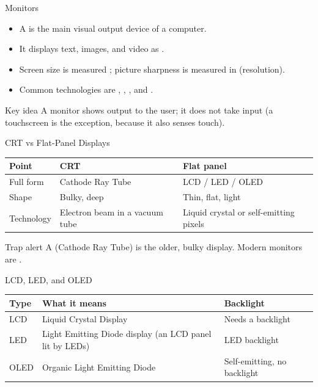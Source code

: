 \documentclass[aspectratio=169]{beamer}
\begin{document}
\begin{frame}{Monitors}
  \begin{itemize}
    \item A  is the main visual output device of a computer.
    \item It displays text, images, and video as .
    \item Screen size is measured ; picture
      sharpness is measured in  (resolution).
    \item Common technologies are , , , and
      .
  \end{itemize}
  \begin{block}{Key idea}
    A monitor shows output to the user; it does not take input (a touchscreen
    is the exception, because it also senses touch).
  \end{block}
\end{frame}

\begin{frame}{CRT vs Flat-Panel Displays}
  \begin{center}
    \begin{tabular}{p{}p{}p{}}
      \toprule
      \textbf{Point} & \textbf{CRT} & \textbf{Flat panel} \\
      \midrule
      Full form & Cathode Ray Tube & LCD / LED / OLED \\
      Shape & Bulky, deep & Thin, flat, light \\
      Technology & Electron beam in a vacuum tube & Liquid crystal or self-emitting pixels \\
      \bottomrule
    \end{tabular}
  \end{center}
  \vspace{0.25cm}
  \begin{alertblock}{Trap alert}
    A  (Cathode Ray Tube) is the older, bulky display. Modern
    monitors are .
  \end{alertblock}
\end{frame}

\begin{frame}{LCD, LED, and OLED}
  \begin{center}
    \begin{tabular}{p{}p{}p{}}
      \toprule
      \textbf{Type} & \textbf{What it means} & \textbf{Backlight} \\
      \midrule
      LCD & Liquid Crystal Display & Needs a backlight \\
      LED & Light Emitting Diode display (an LCD panel lit by LEDs) & LED backlight \\
      OLED & Organic Light Emitting Diode & Self-emitting, no backlight \\
      \bottomrule
    \end{tabular}
  \end{center}
  \vspace{0.2cm}
\end{frame}
\end{document}
